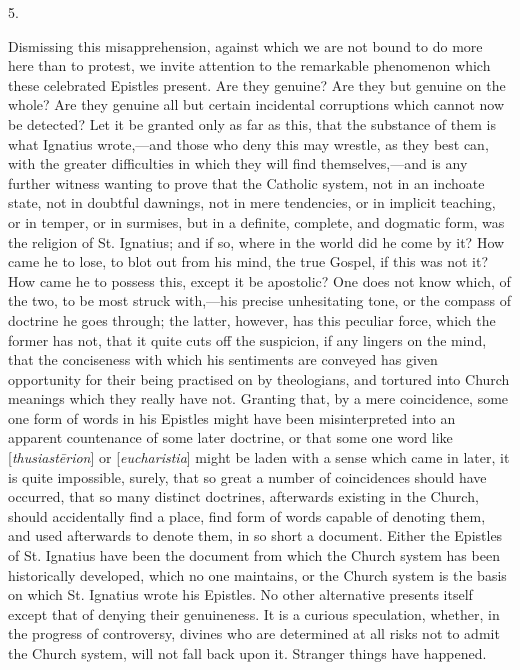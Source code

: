 5.

Dismissing this misapprehension, against which we
are not bound to do more here than to protest, we invite attention to
the remarkable phenomenon which these celebrated Epistles present. Are
they genuine? Are they but genuine on the whole? Are they genuine all
but certain incidental corruptions which cannot now be detected? Let
it be granted only as far as this, that the substance of them is what
Ignatius wrote,—and those who deny this may wrestle, as they best
can, with the greater difficulties in which they will find
themselves,—and is any further witness wanting to prove that the
Catholic system, not in an inchoate state, not in doubtful dawnings,
not in mere tendencies, or in implicit teaching, or in temper, or in
surmises, but in a definite, complete, and dogmatic form, was the
religion of St. Ignatius; and if so, where in the world did he come by
it? How came he to lose, to blot out from his mind, the true Gospel,
if this was not it? How came he to possess this, except it be
apostolic? One does not know which, of the two, to be most struck
with,—his precise unhesitating tone, or the compass of doctrine he
goes through; the latter, however, has this peculiar force, which the
former has not, that it quite cuts off the suspicion, if any lingers
on the mind, that the conciseness with which his sentiments are
conveyed has given opportunity for their being practised on by
theologians, and tortured into Church meanings which they really have
not. Granting that, by a mere coincidence, some one form of words in
his Epistles might have been misinterpreted into an apparent
countenance of some later doctrine, or that some one word like [\emph{thusiast\={e}rion}]
or [\emph{eucharistia}] might be laden with a sense which came in
later, it is quite impossible, surely, that so great a number of coincidences should have occurred, that so many distinct doctrines,
afterwards existing in the Church, should accidentally find a place,
find form of words capable of denoting them, and used afterwards to
denote them, in so short a document. Either the Epistles of St.
Ignatius have been the document from which the Church system has been
historically developed, which no one maintains, or the Church system
is the basis on which St. Ignatius wrote his Epistles. No other
alternative presents itself except that of denying their genuineness.
It is a curious speculation, whether, in the progress of controversy,
divines who are determined at all risks not to admit the Church
system, will not fall back upon it. Stranger things have happened.

